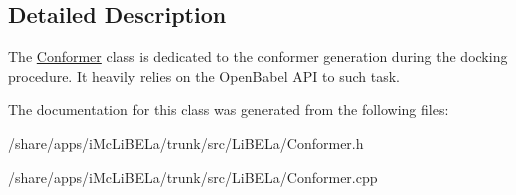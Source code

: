\subsection{Detailed Description}
The \hyperlink{classConformer}{Conformer} class is dedicated to the conformer generation during the docking procedure. It heavily relies on the OpenBabel API to such task. 

The documentation for this class was generated from the following files:\begin{DoxyCompactItemize}
\item 
/share/apps/iMcLiBELa/trunk/src/LiBELa/Conformer.h\item 
/share/apps/iMcLiBELa/trunk/src/LiBELa/Conformer.cpp\end{DoxyCompactItemize}

